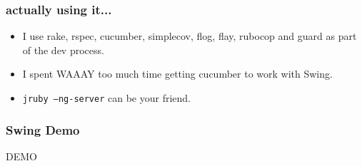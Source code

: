 \begin{frame}\frametitle{actually using it...}
  \begin{itemize}
    \item I use rake, rspec, cucumber, simplecov, flog, flay, rubocop and guard as part of the dev process.
    \item I spent WAAAY too much time getting cucumber to work with Swing.
    \item \texttt{jruby --ng-server} can be your friend.
    \end{itemize}
\end{frame}
\begin{frame}\frametitle{Swing Demo}
  \begin{center}
  {\Huge DEMO}
  \end{center}
\end{frame}





